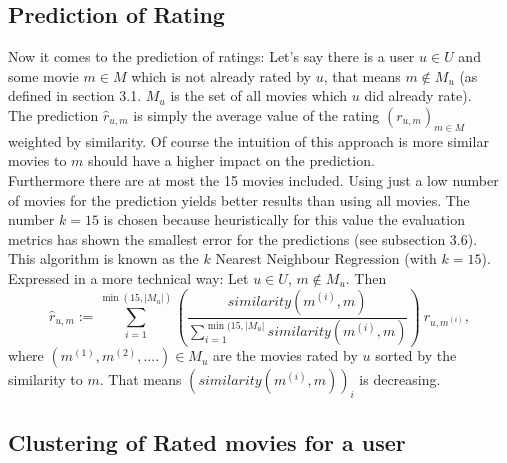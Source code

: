\documentclass{article}
\begin{document}
\subsection{Prediction of Rating}

Now it comes to the prediction of ratings: Let's say there is a user $u\in U$ and some movie $m\in M$ which is not already rated by $u$, that means $m\notin M_u$ (as defined in section 3.1. $M_u$ is the set of all movies which $u$ did already rate).\\
The prediction $\hat{r}_{u,m}$ is simply the average value of the rating $(r_{u,m})_{m\in M}$ weighted by similarity. Of course the intuition of this approach is more similar movies to $m$ should have a higher impact on the prediction.\\
Furthermore there are at most the 15 movies included. Using just a low number of movies for the prediction yields better results than using all movies. The number $k=15$ is chosen because heuristically for this value the evaluation metrics has shown the smallest error for the predictions (see subsection 3.6).\\
This algorithm is known as the $k$ Nearest Neighbour Regression (with $k=15$).\\[2ex]
Expressed in a more technical way: Let $u\in U$, $m\notin M_u$. Then
\[ \hat{r}_{u,m} := \sum_{i=1}^{\min(15, |M_u|)} \left(\frac{similarity(m^{(i)}, m)}{\sum_{i=1}^{\min(15, |M_u|} similarity(m^{(i)}, m)} \right)~r_{u, m^{(i)}},\]
where $(m^{(1)}, m^{(2)}, ....)\in M_u$ are the movies rated by $u$ sorted by the similarity to $m$. That means $(similarity(m^{(i)},m))_i$ is decreasing.


\subsection{Clustering of Rated movies for a user}
\end{document}
